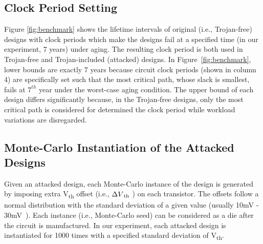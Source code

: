 \subsection{Clock Period Setting}
\label{sec:exp:tc}
Figure \ref{fig:benchmark} shows the lifetime intervals of original (i.e., Trojan-free) designs with clock periods which make the designs fail at a specified time (in our experiment, 7 years) under aging. The resulting clock period is both used in Trojan-free and Trojan-included (attacked) designs. In Figure~\ref{fig:benchmark}, lower bounds are exactly 7 years because circuit clock periods (shown in column 4) are specifically set such that the most critical path, whose slack is smallest, fails at $7^{th}$ year under the worst-case aging condition. The upper bound of each design differs significantly because, in the Trojan-free designs, only the most critical path is considered for determined the clock period while workload variations are disregarded.

\subsection{Monte-Carlo Instantiation of the Attacked Designs}
\label{sec:ins:mc_ins}
Given an attacked design, each Monte-Carlo instance of the design is generated by imposing extra V\textsubscript{th} offset (i.e., $\Delta V\textsubscript{th}$ ) on each transistor. The offsets follow a normal distribution with the standard deviation of a given value (usually 10mV - 30mV~\cite{han2011statistical}\cite{schlunder2017influence}). Each instance (i.e., Monte-Carlo seed) can be considered as a die after the circuit is manufactured. In our experiment, each attacked design is instantiated for 1000 times with a specified standard deviation of V\textsubscript{th}. 


